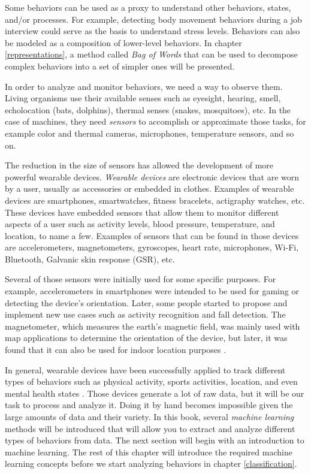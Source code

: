 \documentclass[
  11pt,
]{krantz}
\begin{document}
Some behaviors can be used as a proxy to understand other behaviors, states, and/or processes. For example, detecting body movement behaviors during a job interview could serve as the basis to understand stress levels. Behaviors can also be modeled as a composition of lower-level behaviors. In chapter \ref{representations}, a method called \emph{Bag of Words} that can be used to decompose complex behaviors into a set of simpler ones will be presented.

In order to analyze and monitor behaviors, we need a way to observe them. Living organisms use their available senses such as eyesight, hearing, smell, echolocation (bats, dolphins), thermal senses (snakes, mosquitoes), etc. In the case of machines, they need \emph{sensors} to accomplish or approximate those tasks, for example color and thermal cameras, microphones, temperature sensors, and so on.

The reduction in the size of sensors has allowed the development of more powerful wearable devices. \emph{Wearable devices} are electronic devices that are worn by a user, usually as accessories or embedded in clothes. Examples of wearable devices are smartphones, smartwatches, fitness bracelets, actigraphy watches, etc. These devices have embedded sensors that allow them to monitor different aspects of a user such as activity levels, blood pressure, temperature, and location, to name a few. Examples of sensors that can be found in those devices are accelerometers, magnetometers, gyroscopes, heart rate, microphones, Wi-Fi, Bluetooth, Galvanic skin response (GSR), etc.

Several of those sensors were initially used for some specific purposes. For example, accelerometers in smartphones were intended to be used for gaming or detecting the device's orientation. Later, some people started to propose and implement new use cases such as activity recognition \citep{shoaib2015} and fall detection. The magnetometer, which measures the earth's magnetic field, was mainly used with map applications to determine the orientation of the device, but later, it was found that it can also be used for indoor location purposes \citep{brena2017}.

In general, wearable devices have been successfully applied to track different types of behaviors such as physical activity, sports activities, location, and even mental health states \citep{garciaSurvey2018}. Those devices generate a lot of raw data, but it will be our task to process and analyze it. Doing it by hand becomes impossible given the large amounts of data and their variety. In this book, several \emph{machine learning} methods will be introduced that will allow you to extract and analyze different types of behaviors from data. The next section will begin with an introduction to machine learning. The rest of this chapter will introduce the required machine learning concepts before we start analyzing behaviors in chapter \ref{classification}.
\end{document}
